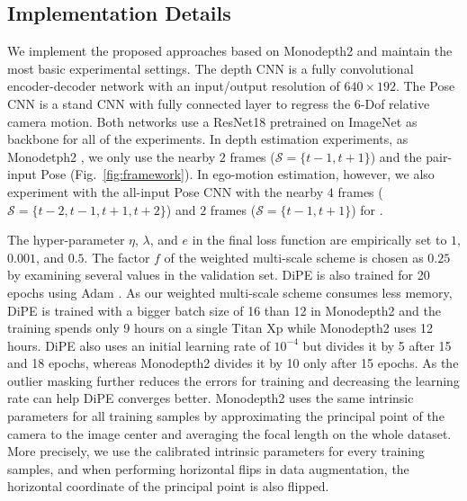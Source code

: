 \documentclass[letterpaper, 10 pt, conference]{ieeeconf}
\begin{document}
\subsection{Implementation Details}
We implement the proposed approaches based on Monodepth2 \cite{godard2019digging} and maintain the most basic experimental settings. 
The depth CNN is a fully convolutional encoder-decoder network with an input/output resolution of $640\times192$. The Pose CNN is a stand CNN with fully connected layer to regress the 6-Dof relative camera motion. 
Both networks use a ResNet18 \cite{he2016deep} pretrained on ImageNet \cite{deng2009imagenet} as backbone for all of the experiments.
In depth estimation experiments, as Monodetph2 \cite{godard2019digging}, we only use the nearby $2$ frames ($\mathcal{S} = \{t-1, t+1\}$) and the pair-input Pose (Fig.~\ref{fig:framework}). In ego-motion estimation, however, we also experiment with the all-input Pose CNN with the nearby $4$ frames  ($\mathcal{S} = \{t-2, t-1, t+1, t+2\}$) and $2$ frames ($\mathcal{S} = \{t-1, t+1\}$) for \cite{zhou2017unsupervised, mahjourian2018unsupervised}.
 

The hyper-parameter $\eta$, $\lambda$, and $e$ in the final loss function are empirically set to $1$, $0.001$, and $0.5$. The factor $f$ of the weighted multi-scale scheme is chosen as $0.25$ by examining several values in the validation set. 
DiPE is also trained for 20 epochs using Adam \cite{kingma2014adam}. As our weighted multi-scale scheme consumes less memory, DiPE is trained with a bigger batch size of 16 than 12 in Monodepth2 and the training spends only 9 hours on a single Titan Xp while Monodepth2 uses 12 hours. DiPE also uses an initial learning rate of  $10^{-4}$ but divides it by 5 after 15 and 18 epochs, whereas Monodepth2 divides it by 10 only after 15 epochs. As the outlier masking further reduces the errors for training and decreasing the learning rate can help DiPE converges better. 
Monodepth2 uses the same intrinsic parameters for all training samples by approximating the principal point of the camera to the image center and averaging the focal length on the whole dataset. More precisely, we use the calibrated intrinsic parameters for every training samples, and when performing horizontal flips in data augmentation, the horizontal coordinate of the principal point is also flipped. 
\end{document}
